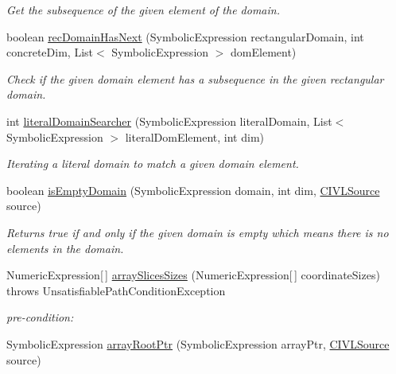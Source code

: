 \begin{DoxyCompactItemize}
\begin{DoxyCompactList}\small\item\em Get the subsequence of the given element of the domain. \end{DoxyCompactList}\item 
boolean \hyperlink{interfaceedu_1_1udel_1_1cis_1_1vsl_1_1civl_1_1dynamic_1_1IF_1_1SymbolicUtility_a3d7e82c034d596a25117938fc85a2e7e}{rec\+Domain\+Has\+Next} (Symbolic\+Expression rectangular\+Domain, int concrete\+Dim, List$<$ Symbolic\+Expression $>$ dom\+Element)
\begin{DoxyCompactList}\small\item\em Check if the given domain element has a subsequence in the given rectangular domain. \end{DoxyCompactList}\item 
int \hyperlink{interfaceedu_1_1udel_1_1cis_1_1vsl_1_1civl_1_1dynamic_1_1IF_1_1SymbolicUtility_a179be20da2aa0508e8e8fa615901a56d}{literal\+Domain\+Searcher} (Symbolic\+Expression literal\+Domain, List$<$ Symbolic\+Expression $>$ literal\+Dom\+Element, int dim)
\begin{DoxyCompactList}\small\item\em Iterating a literal domain to match a given domain element. \end{DoxyCompactList}\item 
boolean \hyperlink{interfaceedu_1_1udel_1_1cis_1_1vsl_1_1civl_1_1dynamic_1_1IF_1_1SymbolicUtility_ae7dec2776313e6f3647e38263a756988}{is\+Empty\+Domain} (Symbolic\+Expression domain, int dim, \hyperlink{interfaceedu_1_1udel_1_1cis_1_1vsl_1_1civl_1_1model_1_1IF_1_1CIVLSource}{C\+I\+V\+L\+Source} source)
\begin{DoxyCompactList}\small\item\em Returns true if and only if the given domain is empty which means there is no elements in the domain. \end{DoxyCompactList}\item 
Numeric\+Expression\mbox{[}$\,$\mbox{]} \hyperlink{interfaceedu_1_1udel_1_1cis_1_1vsl_1_1civl_1_1dynamic_1_1IF_1_1SymbolicUtility_ac6281c37831483b2d418939fdc9fe396}{array\+Slices\+Sizes} (Numeric\+Expression\mbox{[}$\,$\mbox{]} coordinate\+Sizes)  throws Unsatisfiable\+Path\+Condition\+Exception
\begin{DoxyCompactList}\small\item\em pre-\/condition\+: \end{DoxyCompactList}\item 
Symbolic\+Expression \hyperlink{interfaceedu_1_1udel_1_1cis_1_1vsl_1_1civl_1_1dynamic_1_1IF_1_1SymbolicUtility_ae855d4ccb5d4b433e5af57a0c37d642d}{array\+Root\+Ptr} (Symbolic\+Expression array\+Ptr, \hyperlink{interfaceedu_1_1udel_1_1cis_1_1vsl_1_1civl_1_1model_1_1IF_1_1CIVLSource}{C\+I\+V\+L\+Source} source)

\end{DoxyCompactItemize}
